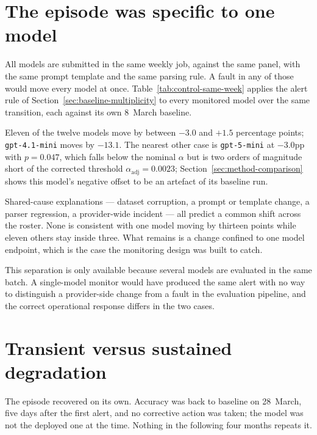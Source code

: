\section{The episode was specific to one model}
\label{sec:mcnemar-at-trigger}

All models are submitted in the same weekly job, against the same panel, with the same prompt template and the same parsing rule. A fault in any of those would move every model at once. Table~\ref{tab:control-same-week} applies the alert rule of Section~\ref{sec:baseline-multiplicity} to every monitored model over the same transition, each against its own 8~March baseline.



Eleven of the twelve models move by between $-3.0$ and $+1.5$ percentage points; \texttt{gpt-4.1-mini} moves by $-13.1$. The nearest other case is \texttt{gpt-5-mini} at $-3.0$pp with $p=0.047$, which falls below the nominal $\alpha$ but is two orders of magnitude short of the corrected threshold $\alpha_{\mathrm{adj}}=0.0023$; Section~\ref{sec:method-comparison} shows this model's negative offset to be an artefact of its baseline run.

Shared-cause explanations --- dataset corruption, a prompt or template change, a parser regression, a provider-wide incident --- all predict a common shift across the roster. None is consistent with one model moving by thirteen points while eleven others stay inside three. What remains is a change confined to one model endpoint, which is the case the monitoring design was built to catch.

This separation is only available because several models are evaluated in the same batch. A single-model monitor would have produced the same alert with no way to distinguish a provider-side change from a fault in the evaluation pipeline, and the correct operational response differs in the two cases.

\section{Transient versus sustained degradation}
\label{sec:transient-provider-degradation}

The episode recovered on its own. Accuracy was back to baseline on 28~March, five days after the first alert, and no corrective action was taken; the model was not the deployed one at the time. Nothing in the following four months repeats it.

